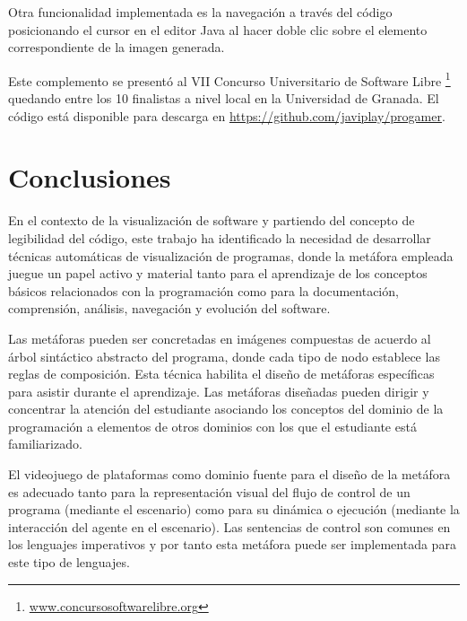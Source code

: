 \documentclass{llncs}
\begin{document}
Otra funcionalidad implementada es la navegación a través del código posicionando el cursor en el editor Java al hacer doble clic sobre el elemento correspondiente de la imagen generada.

Este complemento se presentó al VII Concurso Universitario de Software Libre \footnote{\url{www.concursosoftwarelibre.org}} quedando entre los 10 finalistas a nivel local en la Universidad de Granada. El código está disponible para descarga en \url{https://github.com/javiplay/progamer}.



\section{Conclusiones}
\label{sec:conclusions}

En el contexto de la visualización de software y partiendo del concepto de legibilidad del código, este trabajo ha identificado la necesidad de desarrollar técnicas automáticas de visualización de programas, donde la metáfora empleada juegue un papel activo y material tanto para el aprendizaje de los conceptos básicos relacionados con la programación como para la documentación, comprensión, análisis, navegación y evolución del software.

Las metáforas pueden ser concretadas en imágenes compuestas de acuerdo al árbol sintáctico abstracto del programa, donde cada tipo de nodo establece las reglas de composición. Esta técnica habilita el diseño de metáforas específicas para asistir durante el aprendizaje. Las metáforas diseñadas pueden dirigir y concentrar la atención del estudiante asociando los conceptos del dominio de la programación a elementos de otros dominios con los que el estudiante está familiarizado. 

El videojuego de plataformas como dominio fuente para el diseño de la metáfora es adecuado tanto para la representación visual del flujo de control de un programa (mediante el escenario) como para su dinámica o ejecución (mediante la interacción del agente en el escenario). Las sentencias de control son comunes en los lenguajes imperativos y por tanto esta metáfora puede ser implementada para este tipo de lenguajes. 
\end{document}
